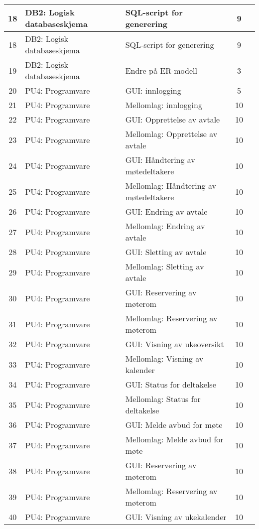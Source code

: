 \begin{table}
\begin{tabularx}{1.3\textwidth}{|c|l|X|c|c|}
	18 & DB2: Logisk databaseskjema & SQL-script for generering & 9 & \\ \hline
	18 & DB2: Logisk databaseskjema & SQL-script for generering & 9 & \\ \hline
	19 & DB2: Logisk databaseskjema & Endre på ER-modell & 3 & \\ \hline
	20 & PU4: Programvare & GUI: innlogging & 5 & \\ \hline
	21 & PU4: Programvare & Mellomlag: innlogging & 10 & \\ \hline
	22 & PU4: Programvare & GUI: Opprettelse av avtale & 10 & \\ \hline
	23 & PU4: Programvare & Mellomlag: Opprettelse av avtale & 10 & \\ \hline
	24 & PU4: Programvare & GUI: Håndtering av møtedeltakere & 10 & \\ \hline
	25 & PU4: Programvare & Mellomlag: Håndtering av møtedeltakere & 10 & \\ \hline
	26 & PU4: Programvare & GUI: Endring av avtale & 10 & \\  \hline
	27 & PU4: Programvare & Mellomlag: Endring av avtale & 10 & \\ \hline
	28 & PU4: Programvare & GUI: Sletting av avtale & 10 & \\ \hline
	29 & PU4: Programvare & Mellomlag: Sletting av avtale & 10 & \\ \hline
	30 & PU4: Programvare & GUI: Reservering av møterom & 10 & \\ \hline
	31 & PU4: Programvare & Mellomlag: Reservering av møterom & 10 & \\ \hline
	32 & PU4: Programvare & GUI: Visning av ukeoversikt & 10 & \\ \hline
	33 & PU4: Programvare & Mellomlag: Visning av kalender  & 10 & \\ \hline
	34 & PU4: Programvare & GUI: Status for deltakelse & 10 & \\ \hline
	35 & PU4: Programvare & Mellomlag: Status for deltakelse  & 10 & \\ \hline
	36 & PU4: Programvare & GUI: Melde avbud for møte & 10 & \\ \hline
	37 & PU4: Programvare & Mellomlag: Melde avbud for møte  & 10 & \\ \hline
	38 & PU4: Programvare & GUI: Reservering av møterom & 10 & \\ \hline
	39 & PU4: Programvare & Mellomlag: Reservering av møterom & 10 & \\ \hline
	40 & PU4: Programvare & GUI: Visning av ukekalender & 10 & \\ \hline

\end{tabularx}
\end{table}
